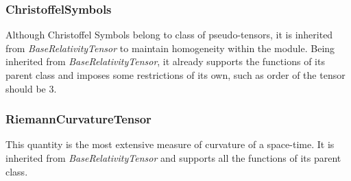 \documentclass[refree]{aa}
\begin{document}


\subsubsection{ChristoffelSymbols}\label{subsubsec:chl}

Although Christoffel Symbols belong to class of pseudo-tensors, it is inherited from \textit{BaseRelativityTensor} to maintain homogeneity within the module. Being inherited from \textit{BaseRelativityTensor}, it already supports the functions of its parent class and imposes some restrictions of its own, such as order of the tensor should be 3.




\subsubsection{RiemannCurvatureTensor}\label{subsubsec:riemann}

This quantity is the most extensive measure of curvature of a space-time. It is inherited from \textit{BaseRelativityTensor} and supports all the functions of its parent class. 
\end{document}
